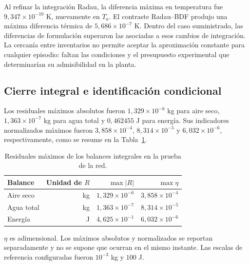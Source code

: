 Al refinar la integración Radau, la diferencia máxima en temperatura fue $9{,}347\times10^{-10}$ K, nuevamente en $T_a$. El contraste Radau--BDF produjo una máxima diferencia térmica de $5{,}686\times10^{-7}$ K. Dentro del caso suministrado, las diferencias de formulación superaron las asociadas a esos cambios de integración. La cercanía entre inventarios no permite aceptar la aproximación constante para cualquier episodio: faltan las condiciones y el presupuesto experimental que determinarían su admisibilidad en la planta.

\subsection{Cierre integral e identificación condicional}

Los residuales máximos absolutos fueron $1{,}329\times10^{-6}$ kg para aire seco, $1{,}363\times10^{-7}$ kg para agua total y $0{,}462455$ J para energía. Sus indicadores normalizados máximos fueron $3{,}858\times10^{-4}$, $8{,}314\times10^{-5}$ y $6{,}032\times10^{-6}$, respectivamente, como se resume en la Tabla~\ref{tab:res_red_balances}.

\begin{table}[htbp]
\centering
\caption{Residuales máximos de los balances integrales en la prueba de la red.}
\label{tab:res_red_balances}
\small
\setlength{\tabcolsep}{5pt}
\begin{tabular}{lrrr}
\toprule
Balance & Unidad de $R$ & $\max|R|$ & $\max\eta$ \\
\midrule
Aire seco & kg & $1{,}329\times10^{-6}$ & $3{,}858\times10^{-4}$ \\
Agua total & kg & $1{,}363\times10^{-7}$ & $8{,}314\times10^{-5}$ \\
Energía & J & $4{,}625\times10^{-1}$ & $6{,}032\times10^{-6}$ \\
\bottomrule
\end{tabular}
\par\vspace{3pt}
\begin{minipage}{0.98\textwidth}\footnotesize
$\eta$ es adimensional. Los máximos absolutos y normalizados se reportan separadamente y no se supone que ocurran en el mismo instante. Las escalas de referencia configuradas fueron $10^{-3}$ kg y $100$ J.
\end{minipage}
\end{table}


